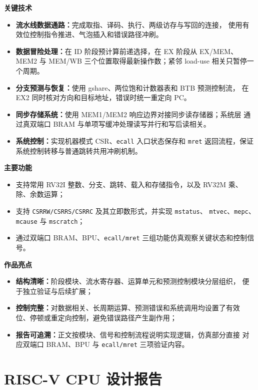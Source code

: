 \documentclass[UTF8,zihao=-4,a4paper]{ctexart}
\numberwithin{table}{section}
\numberwithin{figure}{section}
\newcommand{\code}[1]{\texttt{#1}}
\begin{document}
\noindent\textbf{关键技术}
\begin{itemize}
  \item \textbf{流水线数据通路：}完成取指、译码、执行、两级访存与写回的连接，
        使用有效位控制指令推进、气泡插入和错误路径冲刷。
  \item \textbf{数据冒险处理：}在 ID 阶段预计算前递选择，在 EX 阶段从 EX/MEM、
        MEM2 与 MEM/WB 三个位置取得最新操作数；紧邻 load-use 相关只暂停一个周期。
  \item \textbf{分支预测与恢复：}使用 gshare、两位饱和计数器表和 BTB 预测控制流，
        在 EX2 同时核对方向和目标地址，错误时统一重定向 PC。
  \item \textbf{同步存储系统：}使用 MEM1/MEM2 响应边界对接同步读存储器；系统层
        通过真双端口 BRAM 与单项写缓冲处理读写并行和写后读相关。
  \item \textbf{系统控制：}实现机器模式 CSR、\code{ecall} 入口状态保存和
        \code{mret} 返回流程，保证系统控制转移与普通跳转共用冲刷机制。
\end{itemize}

\noindent\textbf{主要功能}
\begin{itemize}
  \item 支持常用 RV32I 整数、分支、跳转、载入和存储指令，以及 RV32M 乘、除、余数运算；
  \item 支持 \code{CSRRW/CSRRS/CSRRC} 及其立即数形式，并实现 \code{mstatus}、
        \code{mtvec}、\code{mepc}、\code{mcause} 与 \code{mscratch}；
  \item 通过双端口 BRAM、BPU、\code{ecall/mret} 三组功能仿真观察关键状态和控制信号。
\end{itemize}

\noindent\textbf{作品亮点}
\begin{itemize}
  \item \textbf{结构清晰：}阶段模块、流水寄存器、运算单元和预测控制模块分层组织，
        便于独立验证与后续扩展；
  \item \textbf{控制完整：}对数据相关、长周期运算、预测错误和系统调用均设置了有效
        位、停顿或重定向控制，避免错误路径产生副作用；
  \item \textbf{报告可追溯：}正文按模块、信号和控制流程说明实现逻辑，仿真部分直接
        对应双端口 BRAM、BPU 与 \code{ecall/mret} 三项验证内容。
\end{itemize}

\clearpage
{}

\section*{RISC-V CPU 设计报告}
\end{document}
